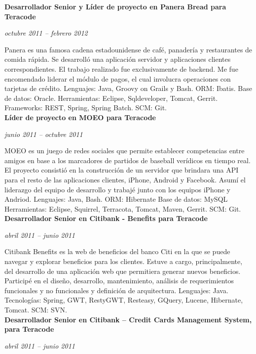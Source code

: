 \documentclass[a4paper,11pt]{article}
\begin{document}
\noindent \textbf{Desarrollador Senior y Líder de proyecto en Panera Bread para
Teracode}

\noindent \emph{octubre 2011 – febrero 2012}

\noindent Panera es una famosa cadena estadounidense de café, panadería y
restaurantes de comida rápida.  Se desarrolló una aplicación servidor y
aplicaciones clientes correspondientes.
El trabajo realizado fue exclusivamente de backend. Me fue encomendado liderar
el módulo de pagos, el cual involucra operaciones con tarjetas de crédito.
Lenguajes: Java, Groovy on Grails y Bash.
ORM: Ibatis.
Base de datos: Oracle.
Herramientas: Eclipse, Sqldeveloper, Tomcat, Gerrit.
Frameworks: REST, Spring, Spring Batch.
SCM: Git. \\

\noindent \textbf{Líder de proyecto en MOEO para Teracode}

\noindent \emph{junio 2011 –  octubre 2011}

\noindent MOEO es un juego de redes sociales que permite establecer
competencias entre amigos en base a los marcadores de partidos de baseball
verídicos en tiempo real.  El proyecto consistió en la construcción de un
servidor que brindara una API para el resto de las aplicaciones clientes,
iPhone, Android y Facebook.
Asumí el liderazgo del equipo de desarrollo y trabajé junto con los equipos
iPhone y Andriod.  Lenguajes: Java, Bash.
ORM: Hibernate
Base de datos: MySQL
Herramientas: Eclipse, Squirrel, Terracota, Tomcat, Maven, Gerrit.
SCM: Git. \\

\noindent \textbf{Desarrollador Senior en Citibank - Benefits para Teracode}

\noindent \emph{abril 2011 – junio 2011}

\noindent Citibank Benefits es la web de beneficios del banco Citi en la que se
puede navegar y explorar beneficios para los clientes.  Estuve a cargo,
principalmente, del desarrollo de una aplicación web que permitiera generar
nuevos beneficios.
Participé en el diseño, desarrollo, mantenimiento, análisis de requerimientos
funcionales y no funcionales y definición de arquitectura.  Lenguajes: Java.
Tecnologías: Spring, GWT, RestyGWT, Resteasy, GQuery, Lucene, Hibernate, Tomcat.
SCM: SVN. \\

\noindent \textbf{Desarrollador Senior en Citibank – Credit Cards Management
System, para Teracode}

\noindent \emph{abril 2011 –  junio 2011}
\end{document}
